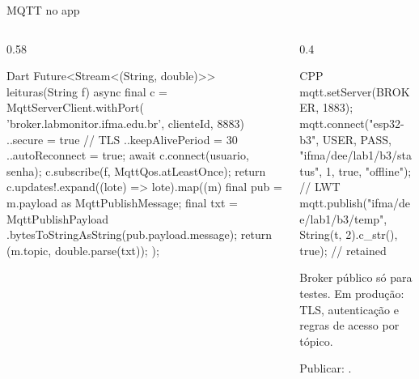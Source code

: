 \documentclass[aspectratio=169,10pt]{beamer}
\begin{document}
\begin{frame}[fragile]{MQTT no app}
  \begin{columns}[T]
    \begin{column}{0.58\textwidth}
\begin{codigo}[title=data/services/mqtt\_service.dart (mqtt\_client)]{Dart}
Future<Stream<(String, double)>> leituras(String f) async {
  final c = MqttServerClient.withPort(
      'broker.labmonitor.ifma.edu.br', clienteId, 8883)
    ..secure = true                     // TLS
    ..keepAlivePeriod = 30
    ..autoReconnect = true;
  await c.connect(usuario, senha);
  c.subscribe(f, MqttQos.atLeastOnce);
  return c.updates!.expand((lote) => lote).map((m) {
    final pub = m.payload as MqttPublishMessage;
    final txt = MqttPublishPayload
        .bytesToStringAsString(pub.payload.message);
    return (m.topic, double.parse(txt));
  });
}
\end{codigo}
    \end{column}
    \begin{column}{0.4\textwidth}
\begin{codigo}[title=ESP32 (PubSubClient)]{CPP}
mqtt.setServer(BROKER, 1883);
mqtt.connect("esp32-b3", USER, PASS,
  "ifma/dee/lab1/b3/status", 1, true,
  "offline");                 // LWT
mqtt.publish("ifma/dee/lab1/b3/temp",
  String(t, 2).c_str(), true); // retained
\end{codigo}
      \begin{atencao}[Segurança]
        Broker público só para testes. Em produção: TLS, autenticação e regras de acesso por tópico.
      \end{atencao}
      \begin{dica}
        Publicar: .
      \end{dica}
    \end{column}
  \end{columns}
\end{frame}
\end{document}
